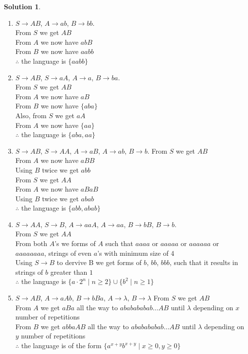 \documentclass{article}
\theoremstyle{definition}
\newtheorem*{solution}{Solution}
\begin{document}
\begin{solution}\ \\
  \begin{enumerate}
  \item $S\to AB$, $A \to ab$, $B\to bb$. \\
    From $S$ we get $AB$ \\
    From $A$ we now have $abB$ \\
    From $B$ we now have $aabb$ \\
    $\therefore$ the language is $\{aabb\}$

  \item $S \to AB$, $S \to aA$, $A \to a$, $B \to ba$. \\
    From $S$ we get $AB$ \\
    From $A$ we now have $aB$ \\
    From $B$ we now have $\{aba\}$ \\
    Also, from $S$ we get $aA$ \\
    From $A$ we now have $\{aa\}$ \\
    $\therefore$ the language is $\{aba, aa\}$

  \item $S \to AB$, $S \to AA$, $A\to aB$, $A\to ab$, $B\to b$.
    From $S$ we get $AB$ \\
    From $A$ we now have $aBB$ \\
    Using $B$ twice we get $abb$ \\
    From $S$ we get $AA$ \\
    From $A$ we now have $aBaB$ \\
    Using $B$ twice we get $abab$ \\
    $\therefore$ the language is $\{abb, abab\}$

  \item $S \to AA$, $S \to B$, $A \to aaA$, $A \to aa$, $B \to bB$, $B \to b$. \\
    From $S$ we get $AA$ \\
    From both $A$'s we forms of $A$ such that $aaaa$ or $aaaaa$ or $aaaaaa$ or $aaaaaaaa$, strings of even $a$'s with minimum size of 4 \\
    Using $S \to B$ to dervive B we get forms of $b$, $bb$, $bbb$, such that it results in strings of $b$ greater than $1$\\
    $\therefore$ the language is $\{a\cdot 2^{n} \mid n \geq 2 \} \cup \{b^2 \mid n \geq 1 \}$

  \item $S \to AB$, $A \to aAb$, $B \to bBa$, $A \to \lambda$, $B \to \lambda$
    From $S$ we get $AB$ \\
    From $A$ we get $aBa$ all the way to $ababababab\ldots AB$ until $\lambda$ depending on $x$ number of repetitions\\
    From $B$ we get $abbaAB$ all the way to $ababababab\ldots AB$ until $\lambda$ depending on $y$ number of repetitions\\
    $\therefore$ the language is of the form $\{a^{x+y}b^{x+y} \mid x \geq 0, y \geq 0\}$
  \end{enumerate}
\end{solution}
\end{document}

